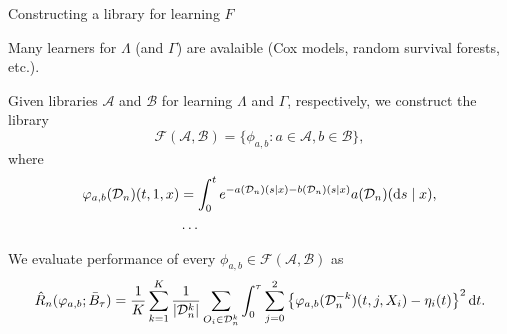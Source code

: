 \documentclass[smaller]{beamer}\usepackage{listings}
\begin{document}
\begin{frame}[label={sec:org339aacc}]{Constructing a library for learning \(F\)}
\small

Many learners for \(\Lambda\) (and \(\Gamma\)) are avalaible (Cox models, random
survival forests, etc.).

\vfill

Given libraries \( \mathcal{A} \) and \( \mathcal{B} \) for learning $\Lambda$
and $\Gamma$, respectively,  we construct the library
\begin{equation*}
  \mathcal{F}(\mathcal{A}, \mathcal{B})
  = \{ \phi_{a, b} : a \in \mathcal{A}, b \in \mathcal{B}\},
\end{equation*}
where
\begin{align*}
  \varphi_{a, b}(\mathcal{D}_n)(t,1,x) &= \int_0^t e^{-a(\mathcal{D}_n)(s \mid
    x) -
    b(\mathcal{D}_n)(s \mid x) }  a(\mathcal{D}_n)(\mathop{}\!\mathrm{d} s \mid x),
  \\
  & \dots 
\end{align*}

We evaluate performance of every
\( \phi_{a, b} \in \mathcal{F}(\mathcal{A}, \mathcal{B}) \) as
\begin{equation*}
  \hat{R}_n(\varphi_{a, b}; \bar{B}_{\tau}) =
  \frac{1}{K}\sum_{k=1}^{K}
  \frac{1}{| \mathcal{D}_n^{k} |}\sum_{O_i \in \mathcal{D}_n^{k}}
  \int_0^{\tau} \sum_{j=0}^{2} 
  \left\{
    \varphi_{a, b}(\mathcal{D}_n^{-k})(t,j, X_i) - \eta_i(t)
  \right\}^2 \mathop{}\!\mathrm{d} t.
\end{equation*}
\end{frame}
\end{document}
